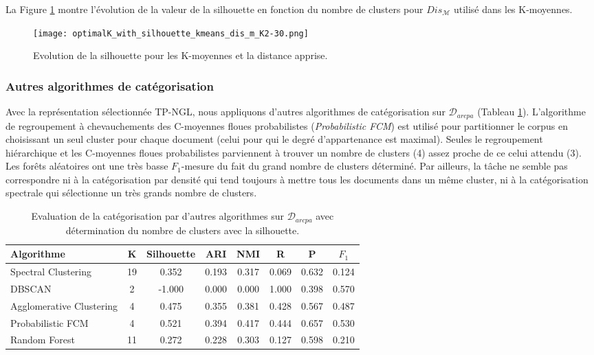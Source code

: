 La Figure \ref{fig:similarite:optimalK_with_silhouette_kmeans_dis_m_K2-30} montre l'évolution de la valeur de la silhouette en fonction du nombre de clusters pour $Dis_\mathcal{M}$ utilisé dans les K-moyennes. 

\begin{figure}[!htb]
	\centering \texttt{[image: optimalK\_with\_silhouette\_kmeans\_dis\_m\_K2-30.png]} \hfil
	
	\caption{Evolution de la silhouette pour les K-moyennes et la distance apprise.}\label{fig:similarite:optimalK_with_silhouette_kmeans_dis_m_K2-30}
\end{figure}
 

\subsubsection{Autres algorithmes de catégorisation}
Avec la représentation sélectionnée TP-NGL, nous appliquons d'autres algorithmes de catégorisation sur $\mathcal{D}_{arcpa}$ (Tableau \ref{tab:similarite:validation-supervisee-optKbySilhouette-autres_algos}). L'algorithme de regroupement à chevauchements des C-moyennes floues probabilistes (\textit{Probabilistic FCM}) est utilisé pour partitionner le corpus en choisissant un seul cluster pour chaque document (celui pour qui le degré d'appartenance est maximal). Seules le regroupement hiérarchique et les C-moyennes floues probabilistes parviennent à trouver un nombre de clusters (4) assez proche de ce celui attendu (3). Les forêts aléatoires ont une très basse $F_1$-mesure du fait du grand nombre de clusters déterminé. Par ailleurs, la tâche ne semble pas correspondre ni à  la catégorisation par densité qui tend toujours à mettre tous les documents dans un même cluster, ni à la catégorisation spectrale qui sélectionne un très grands nombre de clusters. 
\begin{table}[!htb]
	\centering \scriptsize
	\begin{tabular}[pos]{|l|c|c|c|c|c|c|c|}
		\hline
		\textbf{Algorithme}& \textbf{K}& \textbf{Silhouette}& \textbf{ARI} & \textbf{NMI} & \textbf{R} & \textbf{P} & \textbf{$F_1$} \\ \hline
		Spectral Clustering & 19 & 0.352 & 0.193 & 0.317 & 0.069 & 0.632 & 0.124 \\ \hline 
		DBSCAN & 2 & -1.000 & 0.000 & 0.000 & 1.000 & 0.398 & 0.570 \\ \hline 
		Agglomerative Clustering & 4 & 0.475 & 0.355 & 0.381 & 0.428 & 0.567 & 0.487 \\ \hline 
		Probabilistic FCM & 4 & 0.521 & 0.394 & 0.417 & 0.444 & 0.657 & 0.530 \\ \hline 
		Random Forest & 11 & 0.272 & 0.228 & 0.303 & 0.127 & 0.598 & 0.210 \\ \hline 
	\end{tabular}
	\caption{Evaluation de la catégorisation par d'autres algorithmes sur $\mathcal{D}_{arcpa}$ avec détermination du nombre de clusters avec la silhouette.} \label{tab:similarite:validation-supervisee-optKbySilhouette-autres_algos}
\end{table}

